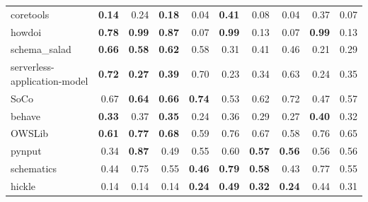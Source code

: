 \documentclass[submit,noauthor,ses,dvipdfmx]{ipsj}
\begin{document}
\begin{table}[t]
{\begin{tabular}{l|rrr|rrr|rrr}
    coretools & \multicolumn{1}{r|}{\textbf{0.14}} & \multicolumn{1}{r|}{0.24} & \textbf{0.18} & \multicolumn{1}{r|}{0.04} & \multicolumn{1}{r|}{\textbf{0.41}} & 0.08 & \multicolumn{1}{r|}{0.04} & \multicolumn{1}{r|}{0.37} & 0.07 \\
    howdoi & \multicolumn{1}{r|}{\textbf{0.78}} & \multicolumn{1}{r|}{\textbf{0.99}} & \textbf{0.87} & \multicolumn{1}{r|}{0.07} & \multicolumn{1}{r|}{\textbf{0.99}} & 0.13 & \multicolumn{1}{r|}{0.07} & \multicolumn{1}{r|}{\textbf{0.99}} & 0.13 \\
    schema\_salad & \multicolumn{1}{r|}{\textbf{0.66}} & \multicolumn{1}{r|}{\textbf{0.58}} & \textbf{0.62} & \multicolumn{1}{r|}{0.58} & \multicolumn{1}{r|}{0.31} & 0.41 & \multicolumn{1}{r|}{0.46} & \multicolumn{1}{r|}{0.21} & 0.29 \\
    serverless-application-model & \multicolumn{1}{r|}{\textbf{0.72}} & \multicolumn{1}{r|}{\textbf{0.27}} & \textbf{0.39} & \multicolumn{1}{r|}{0.70} & \multicolumn{1}{r|}{0.23} & 0.34 & \multicolumn{1}{r|}{0.63} & \multicolumn{1}{r|}{0.24} & 0.35 \\
    SoCo & \multicolumn{1}{r|}{0.67} & \multicolumn{1}{r|}{\textbf{0.64}} & \textbf{0.66} & \multicolumn{1}{r|}{\textbf{0.74}} & \multicolumn{1}{r|}{0.53} & 0.62 & \multicolumn{1}{r|}{0.72} & \multicolumn{1}{r|}{0.47} & 0.57 \\
    behave & \multicolumn{1}{r|}{\textbf{0.33}} & \multicolumn{1}{r|}{0.37} & \textbf{0.35} & \multicolumn{1}{r|}{0.24} & \multicolumn{1}{r|}{0.36} & 0.29 & \multicolumn{1}{r|}{0.27} & \multicolumn{1}{r|}{\textbf{0.40}} & 0.32 \\
    OWSLib & \multicolumn{1}{r|}{\textbf{0.61}} & \multicolumn{1}{r|}{\textbf{0.77}} & \textbf{0.68} & \multicolumn{1}{r|}{0.59} & \multicolumn{1}{r|}{0.76} & 0.67 & \multicolumn{1}{r|}{0.58} & \multicolumn{1}{r|}{0.76} & 0.65 \\
    pynput & \multicolumn{1}{r|}{0.34} & \multicolumn{1}{r|}{\textbf{0.87}} & 0.49 & \multicolumn{1}{r|}{0.55} & \multicolumn{1}{r|}{0.60} & \textbf{0.57} & \multicolumn{1}{r|}{\textbf{0.56}} & \multicolumn{1}{r|}{0.56} & 0.56 \\
    schematics & \multicolumn{1}{r|}{0.44} & \multicolumn{1}{r|}{0.75} & 0.55 & \multicolumn{1}{r|}{\textbf{0.46}} & \multicolumn{1}{r|}{\textbf{0.79}} & \textbf{0.58} & \multicolumn{1}{r|}{0.43} & \multicolumn{1}{r|}{0.77} & 0.55 \\
    hickle & \multicolumn{1}{r|}{0.14} & \multicolumn{1}{r|}{0.14} & 0.14 & \multicolumn{1}{r|}{\textbf{0.24}} & \multicolumn{1}{r|}{\textbf{0.49}} & \textbf{0.32} & \multicolumn{1}{r|}{\textbf{0.24}} & \multicolumn{1}{r|}{0.44} & 0.31 \\

\end{tabular}}
\end{table}
\end{document}
